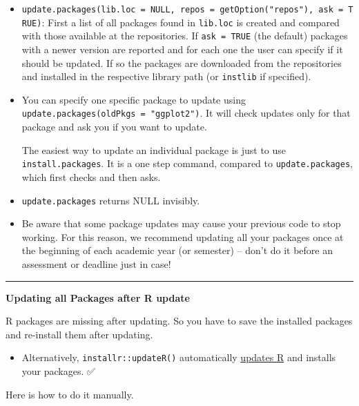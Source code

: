 \documentclass[
  a4paper,
  twoside,
  openright]{book}
\providecommand{\tightlist}{%
  \setlength{\itemsep}{0pt}\setlength{\parskip}{0pt}}
\theoremstyle{definition}
\theoremstyle{definition}
\theoremstyle{definition}
\theoremstyle{definition}
\theoremstyle{remark}
\begin{document}
\begin{itemize}
\item
  \texttt{update.packages(lib.loc\ =\ NULL,\ repos\ =\ getOption("repos"),\ ask\ =\ TRUE)}: First a list of all packages found in \texttt{lib.loc} is created and compared with those available at the repositories. If \texttt{ask\ =\ TRUE} (the default) packages with a newer version are reported and for each one the user can specify if it should be updated. If so the packages are downloaded from the repositories and installed in the respective library path (or \texttt{instlib} if specified).
\item
  You can specify one specific package to update using \texttt{update.packages(oldPkgs\ =\ "ggplot2")}. It will check updates only for that package and ask you if you want to update.

  The easiest way to update an individual package is just to use \texttt{install.packages}. It is a one step command, compared to \texttt{update.packages}, which first checks and then asks.
\item
  \texttt{update.packages} returns NULL invisibly.
\item
  Be aware that some package updates may cause your previous code to stop working. For this reason, we recommend updating all your packages once at the beginning of each academic year (or semester) -- don't do it before an assessment or deadline just in case!
\end{itemize}

\begin{center}\rule{0.5\linewidth}{0.5pt}\end{center}

\textbf{Updating all Packages after {R update}}

R packages are missing after updating. So you have to save the installed packages and re-install them after updating.

\begin{itemize}
\tightlist
\item
  Alternatively, \texttt{installr::updateR()} automatically \hyperref[update-r]{updates R} and installs your packages. ✅
\end{itemize}

Here is how to do it manually.
\end{document}
